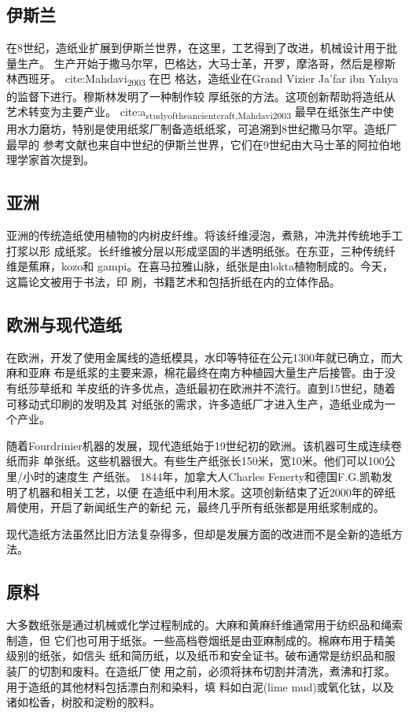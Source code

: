 \documentclass[11pt]{article}
\begin{document}
\subsection{伊斯兰}
\label{sec:org3378c18}
在8世纪，造纸业扩展到伊斯兰世界，在这里，工艺得到了改进，机械设计用于批量生产。
生产开始于撒马尔罕，巴格达，大马士革，开罗，摩洛哥，然后是穆斯林西班牙。
cite:Mahdavi\textsubscript{2003} 在巴
格达，造纸业在Grand Vizier Ja'far ibn Yahya的监督下进行。穆斯林发明了一种制作较
厚纸张的方法。这项创新帮助将造纸从艺术转变为主要产业。
cite:a\textsubscript{study}\textsubscript{of}\textsubscript{the}\textsubscript{ancient}\textsubscript{craft,Mahdavi}\textsubscript{2003}  最早在纸张生产中使
用水力磨坊，特别是使用纸浆厂制备造纸纸浆，可追溯到8世纪撒马尔罕。造纸厂最早的
参考文献也来自中世纪的伊斯兰世界，它们在9世纪由大马士革的阿拉伯地理学家首次提到。

\subsection{亚洲}
\label{sec:org49cd341}
亚洲的传统造纸使用植物的内树皮纤维。将该纤维浸泡，煮熟，冲洗并传统地手工打浆以形
成纸浆。长纤维被分层以形成坚固的半透明纸张。在东亚，三种传统纤维是蕉麻，kozo和
gampi。在喜马拉雅山脉，纸张是由lokta植物制成的。今天，这篇论文被用于书法，印
刷，书籍艺术和包括折纸在内的立体作品。

\subsection{欧洲与现代造纸}
\label{sec:org1bf0b62}
在欧洲，开发了使用金属线的造纸模具，水印等特征在公元1300年就已确立，而大麻和亚麻
布是纸浆的主要来源，棉花最终在南方种植园大量生产后接管。由于没有纸莎草纸和
羊皮纸的许多优点，造纸最初在欧洲并不流行。直到15世纪，随着可移动式印刷的发明及其
对纸张的需求，许多造纸厂才进入生产，造纸业成为一个产业。

随着Fourdrinier机器的发展，现代造纸始于19世纪初的欧洲。该机器可生成连续卷纸而非
单张纸。这些机器很大。有些生产纸张长150米，宽10米。他们可以100公里/小时的速度生
产纸张。 1844年，加拿大人Charles Fenerty和德国F.G.凯勒发明了机器和相关工艺，以便
在造纸中利用木浆。这项创新结束了近2000年的碎纸屑使用，开启了新闻纸生产的新纪
元，最终几乎所有纸张都是用纸浆制成的。

现代造纸方法虽然比旧方法复杂得多，但却是发展方面的改进而不是全新的造纸方法。

\subsection{原料}
\label{sec:org4b28308}
大多数纸张是通过机械或化学过程制成的。大麻和黄麻纤维通常用于纺织品和绳索制造，但
它们也可用于纸张。一些高档卷烟纸是由亚麻制成的。棉麻布用于精美级别的纸张，如信头
纸和简历纸，以及纸币和安全证书。破布通常是纺织品和服装厂的切割和废料。在造纸厂使
用之前，必须将抹布切割并清洗，煮沸和打浆。用于造纸的其他材料包括漂白剂和染料，填
料如白泥(lime mud)或氧化钛，以及诸如松香，树胶和淀粉的胶料。
\end{document}
